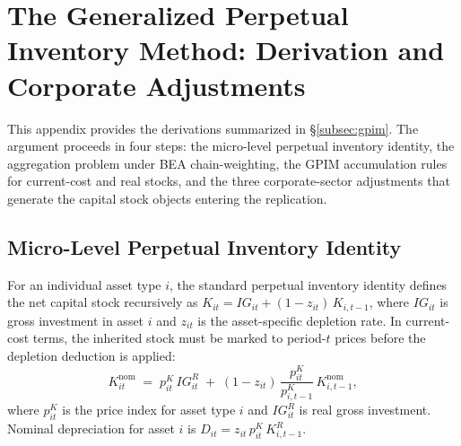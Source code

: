 
\section{The Generalized Perpetual Inventory Method: Derivation and
Corporate Adjustments}
\label{app:gpim}

This appendix provides the derivations summarized in
\S\ref{subsec:gpim}. The argument proceeds in four steps: the
micro-level perpetual inventory identity, the aggregation problem under
BEA chain-weighting, the GPIM accumulation rules for current-cost and
real stocks, and the three corporate-sector adjustments that generate the
capital stock objects entering the replication.


\subsection{Micro-Level Perpetual Inventory Identity}
\label{app:gpim_micro}

For an individual asset type $i$, the standard perpetual inventory
identity defines the net capital stock recursively as
$K_{it} = IG_{it} + (1 - z_{it})\,K_{i,t-1}$,
where $IG_{it}$ is gross investment in asset $i$ and $z_{it}$ is the
asset-specific depletion rate. In current-cost terms, the inherited stock
must be marked to period-$t$ prices before the depletion deduction is
applied:
%
\begin{equation}
  \label{eq:app_micro_pim}
  K_{it}^{\mathrm{nom}}
  \;=\; p_{it}^{K}\,IG_{it}^{R}
  \;+\; (1 - z_{it})\,\frac{p_{it}^{K}}{p_{i,t-1}^{K}}\,K_{i,t-1}^{\mathrm{nom}},
\end{equation}
%
where $p_{it}^{K}$ is the price index for asset type $i$ and
$IG_{it}^{R}$ is real gross investment. Nominal depreciation for asset
$i$ is $D_{it} = z_{it}\,p_{it}^{K}\,K_{i,t-1}^{R}$.



